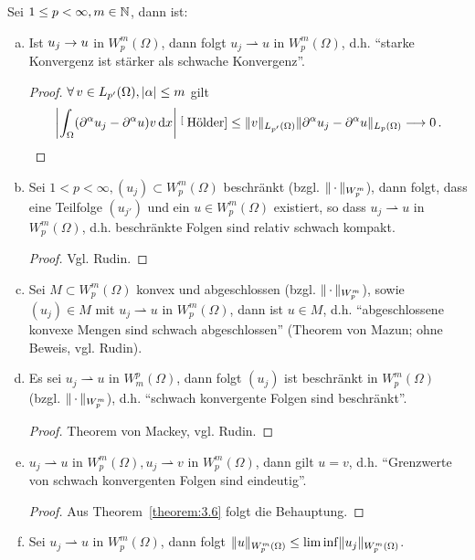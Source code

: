 \begin{bem}
\label{bem:6.19}
Sei $1\leq p < \infty, m \in \mathbb{N}$, dann ist:
\begin{enumerate}[(a)]
\item Ist $u_j \rightarrow u$ in $W^m_p(\Omega)$, dann folgt $u_j \rightharpoonup u$ in $W^m_p(\Omega)$, d.h. "`starke Konvergenz ist stärker als schwache Konvergenz"'.
\begin{proof}
$\forall \, v \in L_{p'}(\Omega), \lvert \alpha\rvert \leq m$ gilt
\[
	\left\lvert \int_\Omega (\partial^\alpha u_j - \partial^\alpha u) v \,\mathrm{d} x\right\rvert \stackrel[\scriptsize\text{Hölder}]{}\leq \lVert v\rVert_{L_{p'}(\Omega)} \lVert \partial^\alpha u_j -\partial^\alpha u \rVert_{L_p(\Omega)} \longrightarrow 0 \, .
\] 
\end{proof}
\item Sei $1 < p < \infty, (u_j)\subset W^m_p(\Omega)$ beschränkt (bzgl. $\lVert \, \cdot\, \rVert_{W^m_p}$), dann folgt, dass eine Teilfolge $(u_{j'})$ und ein $u \in W^m_p(\Omega)$ existiert, so dass $u_j \rightharpoonup u$ in $W^m_p(\Omega)$, d.h. beschränkte Folgen sind relativ schwach kompakt.
\begin{proof}
Vgl. Rudin.
\end{proof}
\item Sei $M\subset W^m_p(\Omega)$ konvex und abgeschlossen (bzgl. $\lVert \, \cdot\, \rVert_{W^m_p}$), sowie $(u_j) \in M$ mit $u_j \rightharpoonup u $ in $W^m_p(\Omega)$, dann ist $u \in M$, d.h. "`abgeschlossene konvexe Mengen sind schwach abgeschlossen"' (Theorem von Mazun; ohne Beweis, vgl. Rudin).
\item Es sei $u_j \rightharpoonup u $ in $W^p_m (\Omega)$, dann folgt $(u_j)$ ist beschränkt in $W^m_p(\Omega)$ (bzgl. $\lVert \, \cdot\, \rVert_{W^m_p}$), d.h. "`schwach konvergente Folgen sind beschränkt"'.
\begin{proof}
Theorem von Mackey, vgl. Rudin.
\end{proof}
\item $u_ j \rightharpoonup u $ in $W^m_p(\Omega), u_j \rightharpoonup v$ in $W^m_p(\Omega)$, dann gilt $u=v$, d.h. "`Grenzwerte von schwach konvergenten Folgen sind eindeutig"'.
\begin{proof}
Aus Theorem~\ref{theorem:3.6} folgt die Behauptung.
\end{proof}
\item Sei $u_j \rightharpoonup u $ in $W^m_p(\Omega)$, dann folgt $\lVert u\rVert_{W^m_p(\Omega)} \leq \lim \inf \lVert u_j\rVert_{W^m_p(\Omega)}$.
\end{enumerate}
\end{bem}

